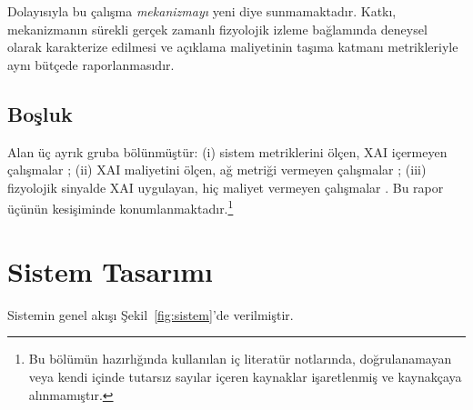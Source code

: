 \documentclass[conference]{IEEEtran}
\begin{document}
Dolayısıyla bu çalışma \emph{mekanizmayı} yeni diye sunmamaktadır. Katkı,
mekanizmanın sürekli gerçek zamanlı fizyolojik izleme bağlamında deneysel
olarak karakterize edilmesi ve açıklama maliyetinin taşıma katmanı metrikleriyle
aynı bütçede raporlanmasıdır.

\subsection{Boşluk}

Alan üç ayrık gruba bölünmüştür: (i) sistem metriklerini ölçen, XAI içermeyen
çalışmalar \cite{erzurumluoglu2025}; (ii) XAI maliyetini ölçen, ağ metriği
vermeyen çalışmalar \cite{shats2025,basaran2025}; (iii) fizyolojik sinyalde XAI
uygulayan, hiç maliyet vermeyen çalışmalar \cite{almadhor2025,elrashidy2025}. Bu
rapor üçünün kesişiminde konumlanmaktadır.\footnote{Bu bölümün hazırlığında
kullanılan iç literatür notlarında, doğrulanamayan veya kendi içinde tutarsız
sayılar içeren kaynaklar işaretlenmiş ve kaynakçaya alınmamıştır.}

\section{Sistem Tasarımı}

Sistemin genel akışı Şekil~\ref{fig:sistem}'de verilmiştir.
\end{document}
